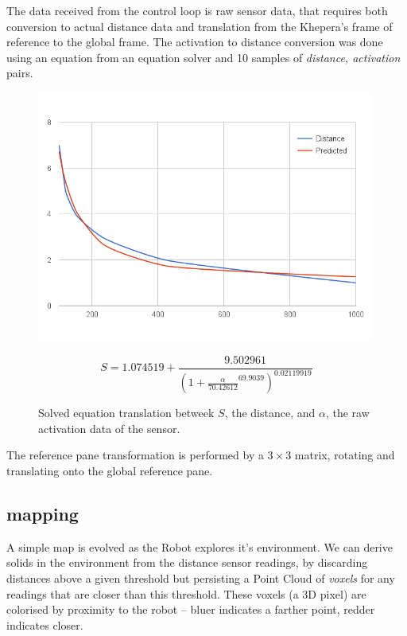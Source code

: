 \documentclass[11pt, a4paper]{article}
\begin{document}
The data received from the control loop is raw sensor data, that requires both conversion to
actual distance data and translation from the Khepera's frame of reference to the global frame.
The activation to distance conversion was done using an equation from an equation solver and 10
samples of \textit{distance, activation} pairs.

\begin{figure}[H]
  \begin{center}
    \includegraphics[width=30em]{../assets/plots/sensor-equation.png}
  \end{center}
  \begin{equation}
    S = 1.074519 + 
    \frac{9.502961}
         {(1 + \frac{\alpha}{70.42612}^{69.9039})^{0.02119919}}
  \end{equation}
  \caption{Solved equation translation betweek $S$, the distance, and $\alpha$, 
    the raw activation data of the sensor.}
\end{figure}

The reference pane transformation is performed by a ${3\times3}$ matrix, rotating and translating
onto the global reference pane.

\subsection{mapping}

A simple map is evolved as the Robot explores it's environment. We can derive solids in the environment
from the distance sensor readings, by discarding distances above a given threshold but persisting a
Point Cloud of \textit{voxels} for any readings that are closer than this threshold. These voxels (a 3D pixel)
are colorised by proximity to the robot -- bluer indicates a farther point, redder indicates closer.
\end{document}
